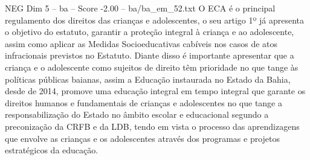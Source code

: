 \begin{textsample}{NEG Dim 5 – ba – Score -2.00 – ba/ba\_em\_52.txt}
O ECA é o principal regulamento dos direitos das crianças e adolescentes, o seu artigo 1º já apresenta o objetivo do estatuto, garantir a proteção integral à criança e ao adolescente, assim como aplicar as Medidas Socioeducativas cabíveis nos casos de atos infracionais previstos no Estatuto.
Diante disso é importante apresentar que a criança e o adolescente como sujeitos de direito têm prioridade no que tange às políticas públicas baianas, assim a Educação instaurada no Estado da Bahia, desde de 2014, promove uma educação integral em tempo integral que garante os direitos humanos e fundamentais de crianças e adolescentes no que tange a responsabilização do Estado no âmbito escolar e educacional segundo a preconização da CRFB e da LDB, tendo em vista o processo das aprendizagens que envolve as crianças e os adolescentes através dos programas e projetos estratégicos da educação.

\end{textsample}
